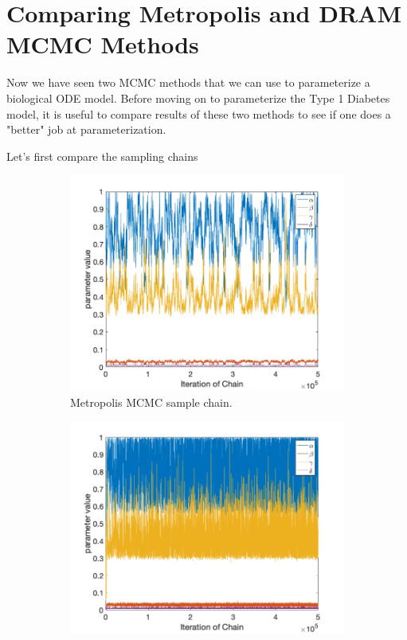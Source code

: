 \documentclass{article}
\begin{document}
\section{Comparing Metropolis and DRAM MCMC Methods} \label{Comparing Metropolis_and_DRAM_MCMC_Methods}
Now we have seen two MCMC methods that we can use to parameterize a biological ODE model. Before moving on to parameterize the Type 1 Diabetes model, it is useful to compare results of these two methods to see if one does a "better" job at parameterization.
\par Let's first compare the sampling chains
\begin{figure}[H]
\begin{subfigure}{.5\textwidth}
  \centering
  \includegraphics[width=1\linewidth]{MCMC_figs/met_lv_final/final_mh_chain.png}
  \caption{Metropolis MCMC sample chain.}
  \label{fig:11amcmcm}
\end{subfigure}
\begin{subfigure}{.5\textwidth}
  \centering
  \includegraphics[width=1\linewidth]{MCMC_figs/met_lv_final/final_dram_chain.png}

\end{subfigure}
\end{figure}
\end{document}
